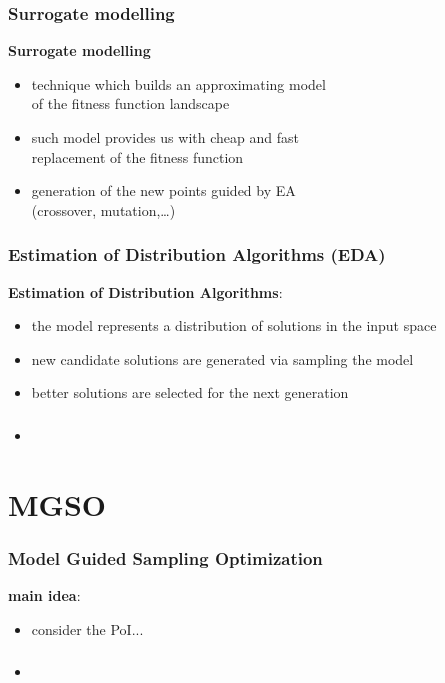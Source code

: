 \documentclass[sans,mathserif]{beamer}
\begin{document}
\begin{frame}
  \frametitle{Surrogate modelling}
  \textbf{Surrogate modelling}
  \begin{itemize}
    \item technique which builds an \alert{approximating model} \\
      of the fitness function landscape
    \item such model provides us with \alert{cheap and fast} \\
      replacement of the fitness function
    \item generation of the new points guided by EA \\
      (crossover, mutation,\ldots)
  \end{itemize}
\end{frame}

\begin{frame}
  \frametitle{Estimation of Distribution Algorithms (EDA)}
  \textbf{Estimation of Distribution Algorithms}:
  \begin{itemize}
    \item the model represents a distribution of solutions in the \alert{input space}
    \item new candidate solutions are generated via sampling the model
    \item better solutions are selected for the next generation 
  \end{itemize}
\end{frame}

\begin{frame}
  \frametitle{}
  \begin{itemize}
    \item
  \end{itemize}
\end{frame}

\section{MGSO}

\begin{frame}
  \frametitle{Model Guided Sampling Optimization}
  \textbf{main idea}:
  \begin{itemize}
    \item consider the PoI...
  \end{itemize}
\end{frame}

\begin{frame}
  \frametitle{}
  \begin{itemize}
    \item
  \end{itemize}
\end{frame}
\end{document}
